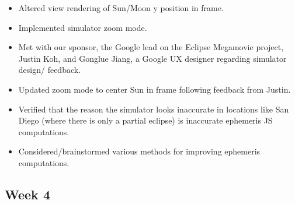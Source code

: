 \documentclass[10pt, onecolumn, draftclsnofoot, letterpaper, compsoc]{IEEEtran}
\begin{document}
    \begin{itemize}

    \item Altered view rendering of Sun/Moon y position in frame.

	\item Implemented simulator zoom mode.

	\item Met with our sponsor, the Google lead on the Eclipse Megamovie project,
		  Justin Koh, and Gonglue Jiang, a Google UX designer regarding simulator design/
		  feedback.

	\item Updated zoom mode to center Sun in frame following feedback from Justin.

	\item Verified that the reason the simulator looks inaccurate in locations like San
		  Diego (where there is only a partial eclipse) is inaccurate ephemeris JS
		  computations.

	\item Considered/brainstormed various methods for improving ephemeris computations.

    \end{itemize}

\subsection{Week 4}
\end{document}
